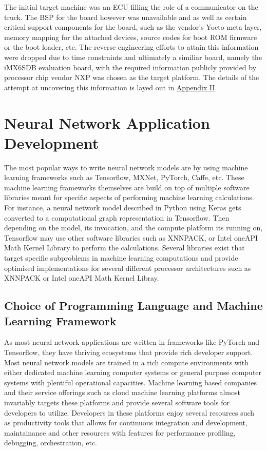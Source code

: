 The initial target machine was an ECU filling the role of a communicator on the truck. The BSP for the board however was unavailable and as well as certain critical support components for the board, such as the vendor's Yocto meta layer, memory mapping for the attached devices, source codes for boot ROM firmware or the boot loader, etc. The reverse engineering efforts to attain this information were dropped due to time constraints and ultimately a similiar board, namely the iMX6SDB evaluation board, with the required information publicly provided by processor chip vendor NXP was chosen as the target platform. The details of the attempt at uncovering this information is layed out in \hyperref[rtc-c300]{Appendix II}.

\section{Neural Network Application Development}

The most popular ways to write neural network models are by using machine learning frameworks such as Tensorflow, MXNet, PyTorch, Caffe, etc. These machine learning frameworks themselves are build on top of multiple software libraries meant for specific aspects of performing machine learning calculations. For instance, a neural network model described in Python using Keras gets converted to a computational graph representation in Tensorflow. Then depending on the model, its invocation, and the compute platform its running on, Tensorflow may use other software libraries such as XNNPACK, or Intel oneAPI Math Kernel Library to perform the calculations. Several libraries exist that target specific subproblems in machine learning computations and provide optimised implementations for several different processor architectures such as XNNPACK or Intel oneAPI Math Kernel Libray.

\subsection{Choice of Programming Language and Machine Learning Framework}

As most neural network applications are written in frameworks like PyTorch and Tensorflow, they have thriving ecosystems that provide rich developer support. Most neural network models are trained in a rich compute environments with either dedicated machine learning computer systems or general purpose computer systems with plentiful operational capacities. Machine learning based companies and their service offerings such as cloud machine learning platforms almost invariably targets these platforms and provide several software tools for developers to utilize. Developers in these platforms enjoy several resources such as productivity tools that allows for continuous integration and development, maintainance and other resources with features for performance profiling, debugging, orchestration, etc.

